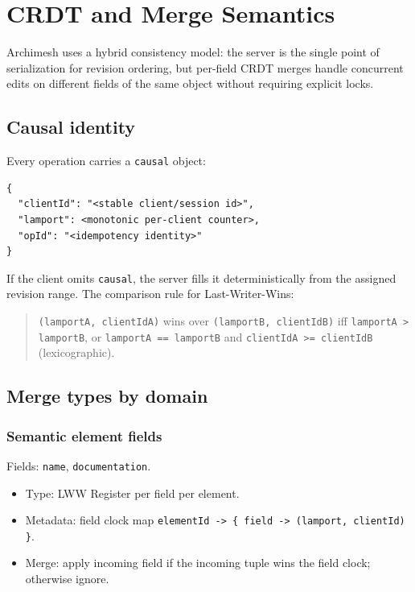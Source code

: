\section{CRDT and Merge Semantics}
\label{sec:CrdtAndMerge}

Archimesh uses a hybrid consistency model: the server is the single point of
serialization for revision ordering, but per-field CRDT merges handle
concurrent edits on different fields of the same object without requiring
explicit locks.

\subsection{Causal identity}

Every operation carries a \texttt{causal} object:

\begin{lstlisting}[caption={Causal metadata}]
{
  "clientId": "<stable client/session id>",
  "lamport": <monotonic per-client counter>,
  "opId": "<idempotency identity>"
}
\end{lstlisting}

If the client omits \texttt{causal}, the server fills it deterministically
from the assigned revision range. The comparison rule for Last-Writer-Wins:

\begin{quote}
\texttt{(lamportA,{} clientIdA)} wins over \texttt{(lamportB,{} clientIdB)} iff
\texttt{lamportA > lamportB}, or \texttt{lamportA == lamportB} and
\texttt{clientIdA >= clientIdB} (lexicographic).
\end{quote}

\subsection{Merge types by domain}

\subsubsection{Semantic element fields}

Fields: \texttt{name}, \texttt{documentation}.

\begin{itemize}
\item Type: LWW Register per field per element.
\item Metadata: field clock map \texttt{elementId -> \{ field -> (lamport, clientId) \}}.
\item Merge: apply incoming field if the incoming tuple wins the field clock;
  otherwise ignore.
\end{itemize}

